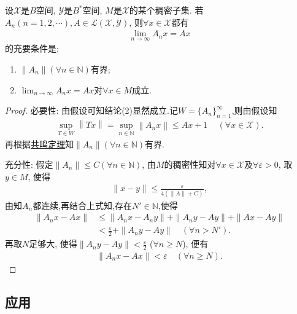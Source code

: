 \documentclass[../../main.tex]{subfiles}%
\begin{document}
\begin{theorem}\label{theorem:泛函分析--Banach-Steinhaus定理}
设$\mathscr{X}$是$B$空间, $\mathscr{Y}$是$B^*$空间, $M$是$\mathscr{X}$的某个稠密子集. 若$A_n(n=1,2,\cdots),A\in\mathscr{L}(\mathscr{X},\mathscr{Y})$, 则$\forall x\in\mathscr{X}$都有
\begin{align*}
\lim_{n\to\infty}A_nx = Ax
\end{align*}
的充要条件是:
\begin{enumerate}[(1)]
\item $\|A_n\|(\forall n\in \mathbb{N})$有界;
\item $\lim_{n\to\infty}A_nx = Ax$对$\forall x\in M$成立.
\end{enumerate}
\end{theorem}
\begin{proof}

{\heiti 必要性:} 由假设可知结论(2)显然成立.记$W=\{A_n\}_{n=1}^{\infty}$,则由假设知
\begin{align*}
\mathop {\mathrm{sup}} \limits_{T\in W}\left\| Tx \right\| =\mathop {\mathrm{sup}} \limits_{n\in \mathbb{N}}\left\| A_nx \right\| \leqslant Ax+1\,\quad (\forall x\in \mathscr{X} ).
\end{align*}
再根据\hyperref[theorem:泛函分析--共鸣定理]{共鸣定理}知$\|A_n\|(\forall n\in \mathbb{N})$有界.

{\heiti 充分性:} 假定$\|A_n\|\leqslant C(\forall n\in\mathbb{N})$, 由$M$的稠密性知对$\forall x\in\mathscr{X}$及$\forall\varepsilon>0$, 取$y\in M$, 使得
\begin{align*}
\|x - y\| \leqslant \frac{\varepsilon}{4(\|A\| + C)},
\end{align*}
由知$A_n$都连续,再结合上式知,存在$N'\in \mathbb{N}$,使得
\begin{align*}
\|A_nx - Ax\| &\leqslant \|A_nx - A_ny\| + \|A_ny - Ay\| + \|Ax - Ay\| \\
&< \frac{\varepsilon}{2} + \|A_ny - Ay\| \quad (\forall n>N').
\end{align*}
再取$N$足够大, 使得$\|A_ny - Ay\| < \frac{\varepsilon}{2}$ ($\forall n\geqslant N$), 便有
\begin{align*}
\|A_nx - Ax\| < \varepsilon \quad (\forall n\geqslant N).
\end{align*}

\end{proof}


\subsection{应用}
\end{document}

